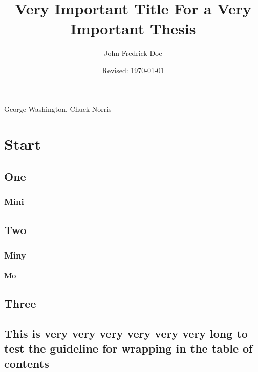 \documentclass{utthesis}
\begin{document}
\author{John Fredrick Doe} 
\title{Very Important Title For a Very Important Thesis} 
\date{Revised: \today}

\UTcopyrightlegend %

\begin{UTcommittee}
\end{UTcommittee}


\frontmatter

\setcounter{page}{4}

%
%

\begin{UTabstract}[s]{George Washington, Chuck Norris}
\lipsum[1]
\end{UTabstract}


\tableofcontents

\listoffigures

\mainmatter

\chapter{Start}
\lipsum[3]
\section{One}
\subsection{Mini}
\section{Two}
\subsection{Miny}
\subsubsection{Mo}
\section{Three}
\section{This is very very very very very very long to test the guideline for wrapping in the table of contents}
\end{document}
